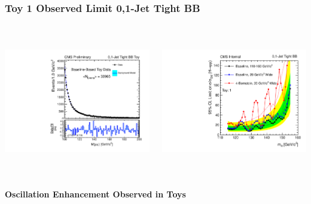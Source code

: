 \documentclass{beamer}
\begin{document}
\begin{frame}
\frametitle{Toy 1 Observed Limit 0,1-Jet Tight BB}
  \vspace{-1.5em}
  \begin{columns}[c]
    \column{60mm}
      \begin{center}
         \includegraphics[height=60mm]{wigglesStudy/toyFit2_Jets01PassPtG10BB_8TeV.pdf}
      \end{center}
    \column{60mm}
      \begin{center}
         \includegraphics[height=60mm]{wigglesStudy/compareLimits_TightBB_toy1.pdf}
      \end{center}
  \end{columns}
  \begin{center}
    \textbf{Oscillation Enhancement Observed in Toys}
  \end{center}
\end{frame}
\end{document}
